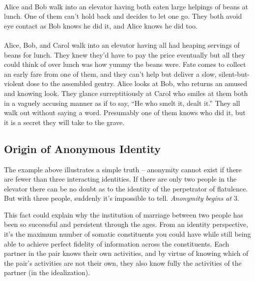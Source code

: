 \documentclass[pra,twocolumn,groupedaddress,10pt]{revtex4}
\theoremstyle{definition}
\begin{document}
\paragraph{}

Alice and Bob walk into an elevator having both eaten large helpings of beans at lunch. One of them can't hold back and decides to let one go. They both avoid eye contact as Bob knows he did it, and Alice knows he did too.

\paragraph{}

Alice, Bob, and Carol walk into an elevator having all had heaping servings of beans for lunch. They knew they'd have to pay the price eventually but all they could think of over lunch was how yummy the beans were. Fate comes to collect an early fare from one of them, and they can't help but deliver a slow, silent-but-violent dose to the assembled gentry. Alice looks at Bob, who returns an amused and knowing look. They glance surreptitiously at Carol who smiles at them both in a vaguely accusing manner as if to say, ``He who smelt it, dealt it.'' They all walk out without saying a word. Presumably one of them knows who did it, but it is a secret they will take to the grave.

\subsection{Origin of Anonymous Identity} \label{sec:orianoide}

The example above illustrates a simple truth -- anonymity cannot exist if there are fewer than three interacting identities. If there are only two people in the elevator there can be no doubt as to the identity of the perpetrator of flatulence. But with three people, suddenly it's impossible to tell. \textit{Anonymity begins at $3$}. 

This fact could explain why the institution of marriage between two people has been so successful and persistent through the ages. From an identity perspective, it's the maximum number of somatic constituents you could have while still being able to achieve perfect fidelity of information across the constituents. Each partner in the pair knows their own activities, and by virtue of knowing which of the pair's activities are not their own, they also know fully the activities of the partner (in the idealization).
\end{document}
